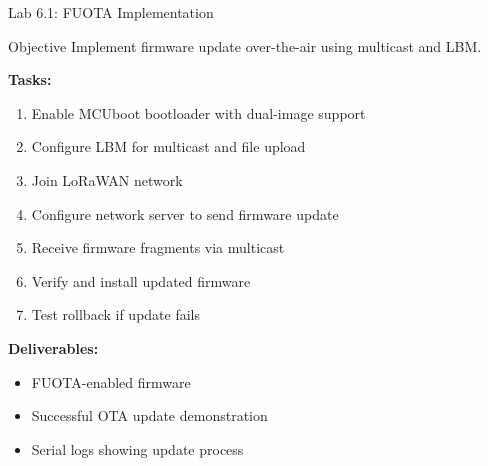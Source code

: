 \documentclass{beamer}
\begin{document}
\begin{frame}{Lab 6.1: FUOTA Implementation}
\begin{block}{Objective}
Implement firmware update over-the-air using multicast and LBM.
\end{block}

\textbf{Tasks:}
\begin{enumerate}
    \item Enable MCUboot bootloader with dual-image support
    \item Configure LBM for multicast and file upload
    \item Join LoRaWAN network
    \item Configure network server to send firmware update
    \item Receive firmware fragments via multicast
    \item Verify and install updated firmware
    \item Test rollback if update fails
\end{enumerate}

\vspace{0.3cm}

\textbf{Deliverables:}
\begin{itemize}
    \item FUOTA-enabled firmware
    \item Successful OTA update demonstration
    \item Serial logs showing update process
\end{itemize}
\end{frame}
\end{document}
